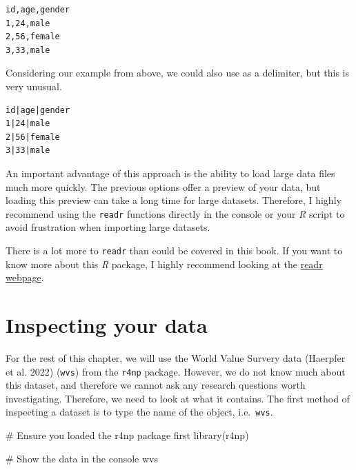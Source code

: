 \documentclass[
  letterpaper,
  DIV=11,
  numbers=noendperiod]{scrreprt}
\newenvironment{Shaded}{\begin{snugshade}}{\end{snugshade}}
\newcommand{\CommentTok}[1]{\textcolor[rgb]{0.37,0.37,0.37}{#1}}
\newcommand{\FunctionTok}[1]{\textcolor[rgb]{0.28,0.35,0.67}{#1}}
\newcommand{\NormalTok}[1]{\textcolor[rgb]{0.00,0.23,0.31}{#1}}
\begin{document}
\begin{verbatim}
id,age,gender
1,24,male
2,56,female
3,33,male
\end{verbatim}

Considering our example from above, we could also use
\texttt{\textbar{}} as a delimiter, but this is very unusual.

\begin{verbatim}
id|age|gender
1|24|male
2|56|female
3|33|male
\end{verbatim}

An important advantage of this approach is the ability to load large
data files much more quickly. The previous options offer a preview of
your data, but loading this preview can take a long time for large
datasets. Therefore, I highly recommend using the \texttt{readr}
functions directly in the console or your \emph{R} script to avoid
frustration when importing large datasets.

There is a lot more to \texttt{readr} than could be covered in this
book. If you want to know more about this \emph{R} package, I highly
recommend looking at the \href{https://readr.tidyverse.org}{readr
webpage}.

\section{Inspecting your data}\label{sec-inspecting-raw-data}

For the rest of this chapter, we will use the World Value Survery data
(Haerpfer et al. 2022) (\texttt{wvs}) from the \texttt{r4np} package.
However, we do not know much about this dataset, and therefore we cannot
ask any research questions worth investigating. Therefore, we need to
look at what it contains. The first method of inspecting a dataset is to
type the name of the object, i.e.~\texttt{wvs}.

\begin{Shaded}
\begin{Highlighting}[]
\CommentTok{\# Ensure you loaded the \textquotesingle{}r4np\textquotesingle{} package first}
\FunctionTok{library}\NormalTok{(r4np)}

\CommentTok{\# Show the data in the console}
\NormalTok{wvs}
\end{Highlighting}
\end{Shaded}
\end{document}
